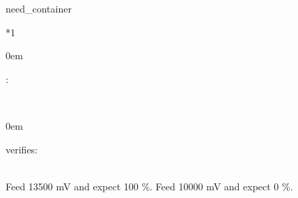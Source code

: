 \documentclass[a4paper,10pt,english]{sphinxmanual}
\begin{document}
\begin{sphinxuseclass}{need_container}

\begin{savenotes}\sphinxattablestart
\sphinxthistablewithglobalstyle
\centering
{}\label{\detokenize{requirements/tests:TC_SOC_CLAMP}}\nobreak
\begin{tabular}[t]{*{1}{}}
\sphinxtoprule
\sphinxtableatstartofbodyhook
\begin{DUlineblock}{0em}
\item[] :     
\end{DUlineblock}
\\
\sphinxhline
\begin{DUlineblock}{0em}
\item[] \item[] 

\item[] \item[] verifies: 

\end{DUlineblock}
\\
\sphinxhline
\sphinxAtStartPar
Feed 13500 mV and expect 100 \%. Feed 10000 mV and expect 0 \%.
\\
\sphinxbottomrule
\end{tabular}
\sphinxtableafterendhook\par
\sphinxattableend\end{savenotes}

\end{sphinxuseclass}
\end{document}
